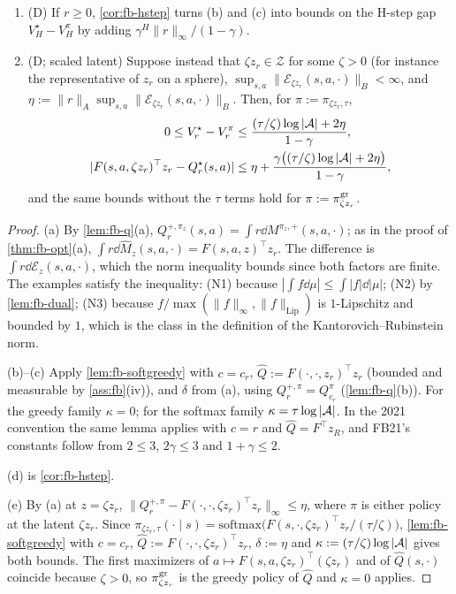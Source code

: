 \begin{theorem}
\begin{enumerate}[resume*]
\item (\textsf{D}) If $r\ge0$, \cref{cor:fb-hstep} turns (b) and (c) into bounds on the H-step gap $V^\star_H-V^\pi_H$ by adding $\gamma^H\|r\|_\infty/(1-\gamma)$.
\item (\textsf{D}; scaled latent) Suppose instead that $\zeta z_r\in\mathcal Z$ for some $\zeta>0$ (for instance the representative of $z_r$ on a sphere), $\sup_{s,a}\|\mathcal E_{\zeta z_r}(s,a,\cdot)\|_B<\infty$, and $\eta:=\|r\|_A\sup_{s,a}\|\mathcal E_{\zeta z_r}(s,a,\cdot)\|_B$. Then, for $\pi:=\pi_{\zeta z_r,\tau}$,
  \begin{align*}
  0\le V^\star_r-V^\pi_r&\le\frac{(\tau/\zeta)\log|\mathcal{A}|+2\eta}{1-\gamma},\\
  |F(s,a,\zeta z_r)^\top z_r-Q^\star_r(s,a)|&\le\eta+\frac{\gamma\big((\tau/\zeta)\log|\mathcal{A}|+2\eta\big)}{1-\gamma},
  \end{align*}
  and the same bounds without the $\tau$ terms hold for $\pi:=\pi^{\mathrm{gr}}_{\zeta z_r}$.
\end{enumerate}
\end{theorem}
\begin{proof}
(a) By \cref{lem:fb-q}(a), $Q^{+,\pi_z}_r(s,a)=\int r\dd M^{\pi_z,+}(s,a,\cdot)$; as in the proof of \cref{thm:fb-opt}(a), $\int r\dd\hat M_z(s,a,\cdot)=F(s,a,z)^\top z_r$.
The difference is $\int r\dd\mathcal E_z(s,a,\cdot)$, which the norm inequality bounds since both factors are finite.
The examples satisfy the inequality: (N1) because $|\int f\dd\mu|\le\int|f|\dd|\mu|$; (N2) by \cref{lem:fb-dual}; (N3) because $f/\max(\|f\|_\infty,\|f\|_{\mathrm{Lip}})$ is $1$-Lipschitz and bounded by $1$, which is the class in the definition of the Kantorovich--Rubinstein norm.

(b)--(c) Apply \cref{lem:fb-softgreedy} with $c=c_r$, $\hat Q:=F(\cdot,\cdot,z_r)^\top z_r$ (bounded and measurable by \cref{ass:fb}(iv)), and $\delta$ from (a), using $Q^{+,\pi}_r=Q^\pi_{c_r}$ (\cref{lem:fb-q}(b)).
For the greedy family $\kappa=0$; for the softmax family $\kappa=\tau\log|\mathcal{A}|$.
In the 2021 convention the same lemma applies with $c=r$ and $\hat Q=F^\top z_R$, and FB21's constants follow from $2\le3$, $2\gamma\le3$ and $1+\gamma\le2$.

(d) is \cref{cor:fb-hstep}.

(e) By (a) at $z=\zeta z_r$, $\|Q^{+,\pi}_r-F(\cdot,\cdot,\zeta z_r)^\top z_r\|_\infty\le\eta$, where $\pi$ is either policy at the latent $\zeta z_r$.
Since $\pi_{\zeta z_r,\tau}(\cdot\mid s)=\mathrm{softmax}\big(F(s,\cdot,\zeta z_r)^\top z_r/(\tau/\zeta)\big)$, \cref{lem:fb-softgreedy} with $c=c_r$, $\hat Q:=F(\cdot,\cdot,\zeta z_r)^\top z_r$, $\delta:=\eta$ and $\kappa:=(\tau/\zeta)\log|\mathcal{A}|$ gives both bounds.
The first maximizers of $a\mapsto F(s,a,\zeta z_r)^\top(\zeta z_r)$ and of $\hat Q(s,\cdot)$ coincide because $\zeta>0$, so $\pi^{\mathrm{gr}}_{\zeta z_r}$ is the greedy policy of $\hat Q$ and $\kappa=0$ applies.
\end{proof}

